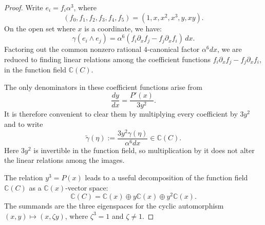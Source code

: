 \documentclass[11pt]{article}
\begin{document}
\begin{proof}
Write $e_i=f_i\alpha^3$, where
\[
(f_0,f_1,f_2,f_3,f_4,f_5)=(1,x,x^2,x^3,y,xy).
\]
On the open set where $x$ is a coordinate, we have:
\[
{\gamma(e_i\wedge e_j)
=\alpha^6(f_i\partial_xf_j-f_j\partial_xf_i)\,dx.}
\]
Factoring out the common nonzero rational $4$-canonical factor
$\alpha^6 dx$, we are reduced to finding linear relations among the coefficient functions
$f_i\partial_xf_j-f_j\partial_xf_i$, in the function field $\mathbb C(C)$.

The only denominators in these coefficient functions arise from
\[
\frac{dy}{dx}=\frac{P'(x)}{3y^2}.
\]
It is therefore convenient to clear them by multiplying every coefficient
by $3y^2$ and to write
\begin{equation*}
{\widetilde\gamma(\eta):=\frac{3y^2\gamma(\eta)}{\alpha^6dx}\in\mathbb C(C).}
\end{equation*}
Here $3y^2$ is invertible in the function field,
so multiplication by it does not alter the linear relations among the images.

The relation $y^3=P(x)$ leads to a useful decomposition of
the function field $\mathbb C(C)$ as a $\mathbb C(x)$-vector space:
\begin{equation}
\label{eq:function-field-cyclic-decomposition}
\mathbb C(C)
=
\mathbb C(x)\oplus y\mathbb C(x)\oplus y^2\mathbb C(x).
\end{equation}
The summands are the three eigenspaces for the cyclic automorphism
$(x,y)\mapsto(x,\zeta y)$, where $\zeta^3=1$ {and $\zeta\neq1$}.



\end{proof}
\end{document}

